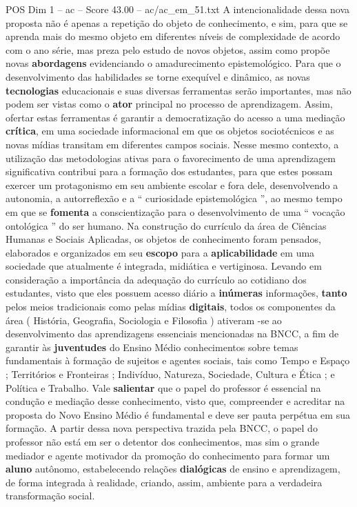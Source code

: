\begin{textsample}{POS Dim 1 – ac – Score 43.00 – ac/ac\_em\_51.txt}
A intencionalidade dessa nova proposta não é apenas a repetição do objeto de conhecimento, e sim, para que se aprenda mais do mesmo objeto em diferentes níveis de complexidade de acordo com o ano série, mas preza pelo estudo de novos objetos, assim como propõe novas \textbf{abordagens} evidenciando o amadurecimento epistemológico.
Para que o desenvolvimento das habilidades se torne exequível e dinâmico, as novas \textbf{tecnologias} educacionais e suas diversas ferramentas serão importantes, mas não podem ser vistas como o \textbf{ator} principal no processo de aprendizagem.
Assim, ofertar estas ferramentas é garantir a democratização do acesso a uma mediação \textbf{crítica}, em uma sociedade informacional em que os objetos sociotécnicos e as novas mídias transitam em diferentes campos sociais.
Nesse mesmo contexto, a utilização das metodologias ativas para o favorecimento de uma aprendizagem significativa contribui para a formação dos estudantes, para que estes possam exercer um protagonismo em seu ambiente escolar e fora dele, desenvolvendo a autonomia, a autorreflexão e a “ curiosidade epistemológica ”, ao mesmo tempo em que se \textbf{fomenta} a conscientização para o desenvolvimento de uma “ vocação ontológica ” do ser humano.
Na construção do currículo da área de Ciências Humanas e Sociais Aplicadas, os objetos de conhecimento foram pensados, elaborados e organizados em seu \textbf{escopo} para a \textbf{aplicabilidade} em uma sociedade que atualmente é integrada, midiática e vertiginosa.
Levando em consideração a importância da adequação do currículo ao cotidiano dos estudantes, visto que eles possuem acesso diário a \textbf{inúmeras} informações, \textbf{tanto} pelos meios tradicionais como pelas mídias \textbf{digitais}, todos os componentes da área ( História, Geografia, Sociologia e Filosofia ) ativeram -se ao desenvolvimento das aprendizagens essenciais mencionadas na BNCC, a fim de garantir às \textbf{juventudes} do Ensino Médio conhecimentos sobre temas fundamentais à formação de sujeitos e agentes sociais, tais como Tempo e Espaço ; Territórios e Fronteiras ; Indivíduo, Natureza, Sociedade, Cultura e Ética ; e Política e Trabalho.
Vale \textbf{salientar} que o papel do professor é essencial na condução e mediação desse conhecimento, visto que, compreender e acreditar na proposta do Novo Ensino Médio é fundamental e deve ser pauta perpétua em sua formação.
A partir dessa nova perspectiva trazida pela BNCC, o papel do professor não está em ser o detentor dos conhecimentos, mas sim o grande mediador e agente motivador da promoção do conhecimento para formar um \textbf{aluno} autônomo, estabelecendo relações \textbf{dialógicas} de ensino e aprendizagem, de forma integrada à realidade, criando, assim, ambiente para a verdadeira transformação social.


\end{textsample}
